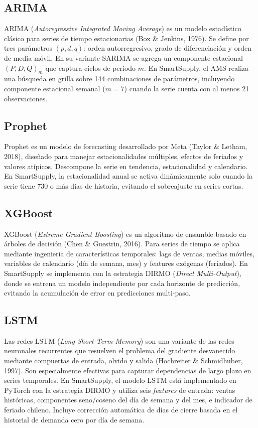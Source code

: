 \documentclass[12pt, a4paper]{report}
\begin{document}
\subsection{ARIMA}

ARIMA (\textit{Autoregressive Integrated Moving Average}) es un modelo estadístico
clásico para series de tiempo estacionarias (Box \& Jenkins, 1976). Se define por tres
parámetros $(p, d, q)$: orden autorregresivo, grado de diferenciación y orden de media
móvil. En su variante SARIMA se agrega un componente estacional $(P, D, Q)_m$ que
captura ciclos de periodo $m$. En SmartSupply, el AMS realiza una búsqueda en grilla
sobre 144 combinaciones de parámetros, incluyendo componente estacional semanal
($m=7$) cuando la serie cuenta con al menos 21 observaciones.

\subsection{Prophet}

Prophet es un modelo de forecasting desarrollado por Meta (Taylor \& Letham, 2018),
diseñado para manejar estacionalidades múltiples, efectos de feriados y valores
atípicos. Descompone la serie en tendencia, estacionalidad y calendario. En SmartSupply,
la estacionalidad anual se activa dinámicamente solo cuando la serie tiene 730 o más
días de historia, evitando el sobreajuste en series cortas.

\subsection{XGBoost}

XGBoost (\textit{Extreme Gradient Boosting}) es un algoritmo de ensamble basado en
árboles de decisión (Chen \& Guestrin, 2016). Para series de tiempo se aplica mediante
ingeniería de características temporales: lags de ventas, medias móviles, variables de
calendario (día de semana, mes) y features exógenas (feriados). En SmartSupply se
implementa con la estrategia DIRMO (\textit{Direct Multi-Output}), donde se entrena un
modelo independiente por cada horizonte de predicción, evitando la acumulación de
error en predicciones multi-paso.

\subsection{LSTM}

Las redes LSTM (\textit{Long Short-Term Memory}) son una variante de las redes
neuronales recurrentes que resuelven el problema del gradiente desvanecido mediante
compuertas de entrada, olvido y salida (Hochreiter \& Schmidhuber, 1997). Son
especialmente efectivas para capturar dependencias de largo plazo en series temporales.
En SmartSupply, el modelo LSTM está implementado en PyTorch con la estrategia DIRMO
y utiliza seis \textit{features} de entrada: ventas históricas, componentes seno/coseno del
día de semana y del mes, e indicador de feriado chileno. Incluye corrección automática
de días de cierre basada en el historial de demanda cero por día de semana.
\end{document}

